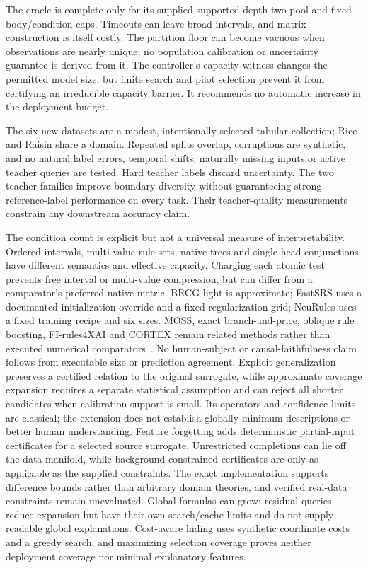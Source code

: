 \documentclass[review,12pt]{elsarticle}
\begin{document}
The oracle is complete only for its supplied supported depth-two pool and fixed body/condition caps. Timeouts can leave broad intervals, and matrix construction is itself costly. The partition floor can become vacuous when observations are nearly unique; no population calibration or uncertainty guarantee is derived from it. The controller's capacity witness changes the permitted model size, but finite search and pilot selection prevent it from certifying an irreducible capacity barrier. It recommends no automatic increase in the deployment budget.

The six new datasets are a modest, intentionally selected tabular collection; Rice and Raisin share a domain. Repeated splits overlap, corruptions are synthetic, and no natural label errors, temporal shifts, naturally missing inputs or active teacher queries are tested. Hard teacher labels discard uncertainty. The two teacher families improve boundary diversity without guaranteeing strong reference-label performance on every task. Their teacher-quality measurements constrain any downstream accuracy claim.

The condition count is explicit but not a universal measure of interpretability. Ordered intervals, multi-value rule sets, native trees and single-head conjunctions have different semantics and effective capacity. Charging each atomic test prevents free interval or multi-value compression, but can differ from a comparator's preferred native metric. BRCG-light is approximate; FastSRS uses a documented initialization override and a fixed regularization grid; NeuRules uses a fixed training recipe and six sizes. MOSS, exact branch-and-price, oblique rule boosting, FI-rules4XAI and CORTEX remain related methods rather than executed numerical comparators~\citep{liu2025moss,behzadimanesh2026,kozielski2025,kopanja2025}. No human-subject or causal-faithfulness claim follows from executable size or prediction agreement. Explicit generalization preserves a certified relation to the original surrogate, while approximate coverage expansion requires a separate statistical assumption and can reject all shorter candidates when calibration support is small. Its operators and confidence limits are classical; the extension does not establish globally minimum descriptions or better human understanding. Feature forgetting adds deterministic partial-input certificates for a selected source surrogate. Unrestricted completions can lie off the data manifold, while background-constrained certificates are only as applicable as the supplied constraints. The exact implementation supports difference bounds rather than arbitrary domain theories, and verified real-data constraints remain unevaluated. Global formulas can grow; residual queries reduce expansion but have their own search/cache limits and do not supply readable global explanations. Cost-aware hiding uses synthetic coordinate costs and a greedy search, and maximizing selection coverage proves neither deployment coverage nor minimal explanatory features.
\end{document}

